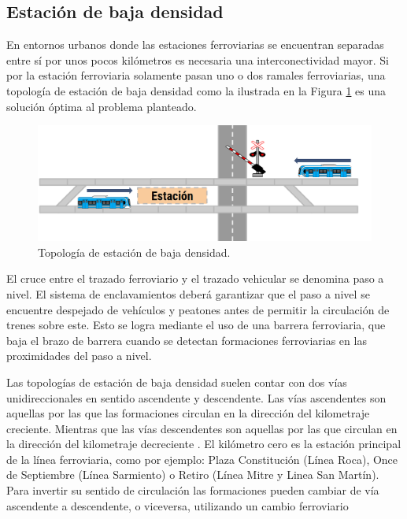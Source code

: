 \subsection{Estación de baja densidad}


En entornos urbanos donde las estaciones ferroviarias se encuentran separadas entre sí por unos pocos kilómetros es necesaria una interconectividad mayor. Si por la estación ferroviaria solamente pasan uno o dos ramales ferroviarias, una topología de estación de baja densidad como la ilustrada en la Figura \ref{fig:simple_1} es una solución óptima al problema planteado.

    \begin{figure}[h]
        \centering
        \includegraphics[width=1\textwidth]{Figuras/simple}
        \centering\caption{Topología de estación de baja densidad.}
        \label{fig:simple_1}
    \end{figure}

El cruce entre el trazado ferroviario y el trazado vehicular se denomina paso a nivel. El sistema de enclavamientos deberá garantizar que el paso a nivel se encuentre despejado de vehículos y peatones antes de permitir la circulación de trenes sobre este. Esto se logra mediante el uso de una barrera ferroviaria, que baja el brazo de barrera cuando se detectan formaciones ferroviarias en las proximidades del paso a nivel.

Las topologías de estación de baja densidad suelen contar con dos vías unidireccionales en sentido ascendente y descendente. 
Las vías ascendentes son aquellas por las que las formaciones circulan en la dirección del kilometraje creciente. Mientras que las vías descendentes son aquellas por las que circulan en la dirección del kilometraje decreciente \cite{RITO}. El kilómetro cero es la estación principal de la línea ferroviaria, como por ejemplo: Plaza Constitución (Línea Roca), Once de Septiembre (Línea Sarmiento) o Retiro (Línea Mitre y Linea San Martín). Para invertir su sentido de circulación las formaciones pueden cambiar de vía
ascendente a descendente, o viceversa, utilizando un cambio ferroviario